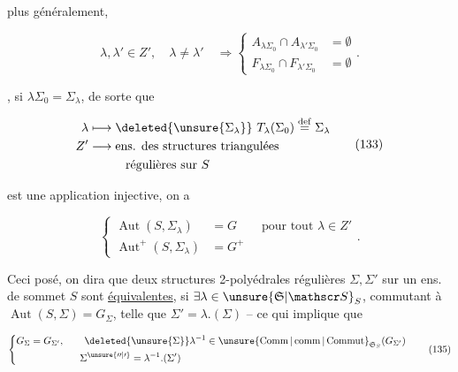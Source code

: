 
plus généralement, 

\[
 \lambda,\lambda'\in Z',\quad\lambda\ne\lambda'\quad\Longrightarrow
 \left\{\begin{aligned}
 A_{\lambda\Sigma_0}\cap A_{\lambda'\Sigma_0}&=\emptyset\\
 F_{\lambda\Sigma_0}\cap F_{\lambda'\Sigma_0}&=\emptyset
 \end{aligned}\right. .
 \tag*{(132bis)}
\]

  , si $\lambda\Sigma_0=\Sigma_\lambda$, de sorte que

\[
 \begin{aligned}
 \lambda&\longmapsto\deleted{\unsure{\Sigma_\lambda}}\ T_\lambda(\Sigma_0)\overset{\mathrm{def}}{=}\Sigma_\lambda\\
 Z'&\longrightarrow\text{ens. des structures triangulées}\\
 &\hspace{3em}\text{régulières sur }S
 \end{aligned}
 \tag*{(133)}
\]



est une application injective, on a

\[
 \left\{\begin{aligned}
 \operatorname{Aut}(S,\Sigma_\lambda)&=G\qquad\text{pour tout }\lambda\in Z'\\
 \operatorname{Aut}^{+}(S,\Sigma_\lambda)&=G^+
 \end{aligned}\right. .
 \tag*{(134)}
\]

Ceci posé, on dira que deux structures 2-polyédrales  régulières $\Sigma,\Sigma'$ sur un ens. de sommet $S$ sont  \uline{équivalentes}, si $\exists\lambda\in\unsure{\mathfrak S|\mathscr S}_S$, commutant à $\operatorname{Aut}(S,\Sigma)=G_\Sigma$, telle que $\Sigma'=\lambda.(\Sigma)$ -- ce qui implique que

\[
 \left\{\begin{aligned}
 G_\Sigma&=G_{\Sigma'},\qquad \deleted{\unsure{\Sigma}}\lambda^{-1}\in\unsure{\operatorname{Comm}|\operatorname{comm}|\operatorname{Commut}}_{\mathfrak S_S}(G_{\Sigma'})\\
 &\hspace{5em}\Sigma^{\unsure{\prime\prime|\prime}}=\lambda^{-1}.(\Sigma')
 \end{aligned}\right.
 \tag*{(135)}
\]

